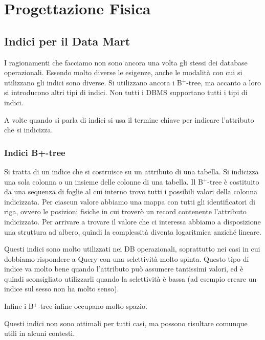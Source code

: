 \section{Progettazione Fisica}

\subsection{Indici per il Data Mart}

I ragionamenti che facciamo non sono ancora una volta gli stessi dei database operazionali. Essendo molto diverse le esigenze, anche le modalità con cui si utilizzano gli indici sono diverse. Si utilizzano ancora i B$^{+}$-tree, ma accanto a loro si introducono altri tipi di indici. Non tutti i DBMS supportano tutti i tipi di indici.

\begin{warn}
	A volte quando si parla di indici si usa il termine chiave per indicare l'attributo che si indicizza.
\end{warn}

\subsubsection{Indici B+-tree}
Si tratta di un indice che si costruisce su un attributo di una tabella. Si indicizza una sola colonna o un insieme delle colonne di una tabella. Il B$^{+}$-tree è costituito da una sequenza di foglie al cui interno trovo tutti i possibili valori della colonna indicizzata. Per ciascun valore abbiamo una mappa con tutti gli identificatori di riga, ovvero le posizioni fisiche in cui troverò un record contenente l'attributo indicizzato. Per arrivare a trovare il valore che ci interessa abbiamo a disposizione una struttura ad albero, quindi la complessità diventa logaritmica anziché lineare.

\noindent Questi indici sono molto utilizzati nei DB operazionali, soprattutto nei casi in cui dobbiamo rispondere a Query con una selettività molto spinta. Questo tipo di indice va molto bene quando l'attributo può assumere tantissimi valori, ed è quindi sconsigliato utilizzarli quando la selettività è bassa (ad esempio creare un indice sul sesso non ha molto senso).

\noindent Infine i B$^{+}$-tree infine occupano molto spazio.

\noindent Questi indici non sono ottimali per tutti casi, ma possono risultare comunque utili in alcuni contesti.

